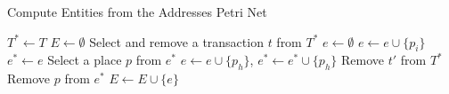 \documentclass{beamer}
\begin{document}
\begin{frame}[fragile]{}
    \footnotesize
    \begin{algorithm}[H]
        \footnotesize
        \caption{Compute Entities from the Addresses Petri Net}\label{alg:entities}
        \begin{algorithmic}[1]
            \State $T^* \gets T$ 
            \State $E \gets \emptyset$ 
            \State Select and remove a transaction $t$ from $T^*$
            \State $e \gets \emptyset$ 
            \State $e \gets e \cup \{p_i\}$
            \EndFor
            \State $e^* \gets e$ 
            \State Select a place $p$ from $e^*$
            \State $e \gets e \cup \{p_h\}$, $e^* \gets e^* \cup \{p_h\}$
            \EndFor
            \State Remove $t'$ from $T^*$
            \EndFor
            \State Remove $p$ from $e^*$
            \EndWhile
            \State $E \gets E \cup \{e\}$
            \EndWhile
        \end{algorithmic}
    \end{algorithm}
\end{frame}
\end{document}
